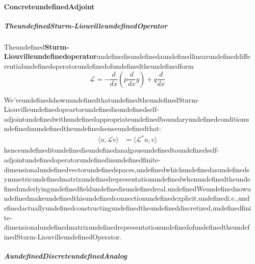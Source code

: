 \paragraph{ConcreteundefinedAdjoint}

\subparagraph{TheundefinedSturm-LiouvilleundefinedOperator}

Theundefined\textbf{Sturm-Liouvilleundefinedoperator}undefinedisundefinedaundefinedlinearundefineddifferentialundefinedoperatorundefinedofundefinedtheundefinedform
\begin{equation}
\mathcal L=-\frac{d}{dx}\left(p\frac{d}{dx}y\right)+q\frac{d}{dx}
\end{equation}

We'veundefinedshownundefinedthatundefinedtheundefinedSturm-Liouvilleundefinedopeartorundefinedisundefinedself-adjointundefinedwithundefinedappropriateundefinedboundaryundefinedconditionundefinedinundefinedtheundefinedsenseundefinedthat:
\begin{equation}
\begin{aligned}
\langle u, \mathcal Lv \rangle &= \langle \mathcal L^*u, v \rangle
\end{aligned}
\end{equation}
henceundefineditundefinedisundefinedanalgousundefinedtoundefinedself-adjointundefinedoperatorundefinedinundefinedfinite-dimensionalundefinedvectorundefinedspaces,undefinedwhichundefinedasundefinedsymmetricundefinedmatrixundefinedrepresentationundefinedwhenundefinedtheundefinedunderlyingundefinedfieldundefinedisundefinedreal.undefinedWeundefinednowundefinedmakeundefinedthisundefinedconnectionundefinedexplicit,undefinedi.e.,undefinedactuallyundefinedconstructingundefinedtheundefineddiscretized,undefinedfinite-dimensionalundefinedmatrixundefinedrepresentationundefinedofundefinedtheundefinedSturm-LiouvilleundefinedOperator.

\subparagraph{AundefinedDiscreteundefinedAnalog}

